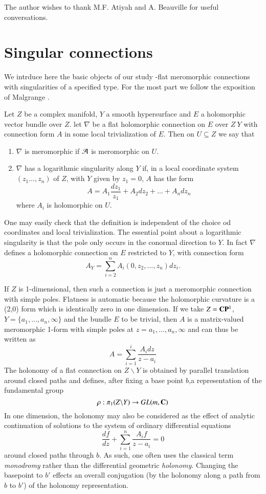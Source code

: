 The author wishes to thank M.F. Atiyah and A. Beauville for useful conversations.

\section{Singular connections}\label{rt7-sec-2}  
We intrduce here the basic objects of our study -flat meromorphic connections with singularities of a specified type. For the most part we follow the exposition of Malgrange \cite{art7-key10}.

\begin{defini}\label{art7-definition-1}
Let $Z$ be a complex manifold, $Y$ a smooth hypersurface and $E$ a holomorphic vector bundle over $Z$. let $\nabla$ be a flat holomorphic connection on $E$ over $Z \ Y$ with connection form $A$ in some local trivialization of $E$. Then on $U\subseteq Z$ we say that
\begin{enumerate}[(1)]
\item $\nabla$ is meromorphic if $\mathcal{A}$ is meromorphic on $U$.

\item $\nabla$ has a logarithmic singularity along $Y$ if, in a local coordinate system $(z_{1}\ldots, z_{n})$ of $Z$, with $Y$ given by $z_{1} = 0$, $A$ has the form
$$
A = A_{1}\dfrac{dz_{1}}{z_{1}} + A_{2}dz_{2} + \ldots + A_{n}dz_{n}
$$
where $A_{i}$ is holomorphic on $U$.
\end{enumerate}
\end{defini}

One may easily check that the definition is independent of the choice od coordinates and local trivialization. The essential point about a logarithmic singularity is that the pole only occurs in the conormal direction to $Y$. In fact $\nabla$ defines a holomorphic connection on $E$ restricted to $Y$, with connection form
$$
A_{Y} = \sum\limits_{i=2}^{n}A_{i}(0, z_{2}, \ldots, z_{n})dz_{i}.
$$

If $Z$ is 1-dimensional, then such a connection is just a meromorphic connection with simple poles. Flatness is automatic because the holomorphic curvature is a (2,0) form which is identically zero in one dimension. If we take $Z=\mathbf{C}\mathbf{P}^{1}$, $Y = \{a_{1}, \ldots, a_{n}, \infty\}$ and the bundle $E$ to be trivial, then $A$ is a matrix-valued meromorphic 1-form with simple poles at $z=a_{1},\ldots, a_{n}, \infty$ and can thus be written as
$$
A = \sum\limits_{i =1}^{i}\dfrac{A_{i}dz}{z-a_{i}}
$$
The holonomy of a flat connection on $Z\backslash Y$ is obtained by parallel translation around closed paths and defines, after fixing a base point $b$,a representation of the fundamental group
$$
\rho : \pi_{1}(Z\backslash Y) \rightarrow GL(m ,\mathbf{C})
$$
In one dimension, the holonomy may also be considered as the effect of analytic continuation of solutions to the system of ordinary differential equations
$$
\dfrac{df}{dz} + \sum\limits_{i=1}^{n} \dfrac{A_{i}f}{z-a_{i}} = 0
$$
around closed paths through $b$. As such, one often uses the classical term \textit{monodromy} rather than the differential geometric \textit{holonomy}. Changing the basepoint to $b'$ effects an overall conjugation (by the holonomy along a path from $b$ to $b'$) of the holonomy representation.

